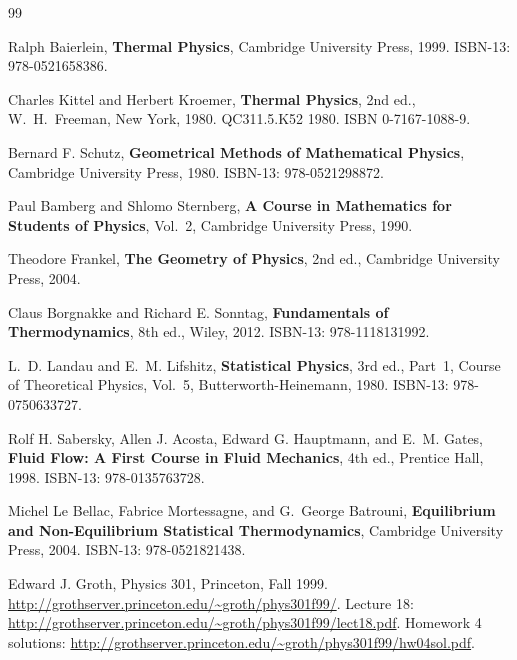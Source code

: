 \begin{thebibliography}{99}

Ralph Baierlein, \textbf{Thermal Physics}, Cambridge University Press, 1999.
ISBN-13: 978-0521658386.

Charles Kittel and Herbert Kroemer, \textbf{Thermal Physics}, 2nd ed., W.~H.~Freeman, New York, 1980.
QC311.5.K52 1980. ISBN 0-7167-1088-9.

Bernard F. Schutz, \textbf{Geometrical Methods of Mathematical Physics}, Cambridge University Press, 1980.
ISBN-13: 978-0521298872.

Paul Bamberg and Shlomo Sternberg, \textbf{A Course in Mathematics for Students of Physics}, Vol.~2, Cambridge University Press, 1990.

Theodore Frankel, \textbf{The Geometry of Physics}, 2nd ed., Cambridge University Press, 2004.

Claus Borgnakke and Richard E. Sonntag, \textbf{Fundamentals of Thermodynamics}, 8th ed., Wiley, 2012.
ISBN-13: 978-1118131992.

L.~D. Landau and E.~M. Lifshitz, \textbf{Statistical Physics}, 3rd ed., Part~1, Course of Theoretical Physics, Vol.~5, Butterworth-Heinemann, 1980.
ISBN-13: 978-0750633727.

Rolf H. Sabersky, Allen J. Acosta, Edward G. Hauptmann, and E.~M. Gates, \textbf{Fluid Flow: A First Course in Fluid Mechanics}, 4th ed., Prentice Hall, 1998.
ISBN-13: 978-0135763728.

Michel Le Bellac, Fabrice Mortessagne, and G.~George Batrouni, \textbf{Equilibrium and Non-Equilibrium Statistical Thermodynamics}, Cambridge University Press, 2004.
ISBN-13: 978-0521821438.

Edward J. Groth, Physics 301, Princeton, Fall 1999.
\url{http://grothserver.princeton.edu/~groth/phys301f99/}.
Lecture 18: \url{http://grothserver.princeton.edu/~groth/phys301f99/lect18.pdf}.
Homework 4 solutions: \url{http://grothserver.princeton.edu/~groth/phys301f99/hw04sol.pdf}.


\end{thebibliography}
